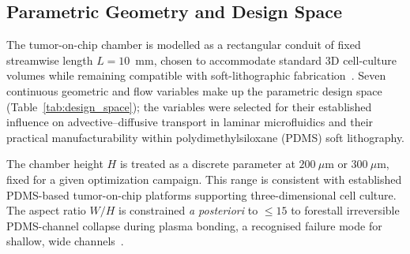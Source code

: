 \documentclass[12pt]{article}
\begin{document}
\subsection{Parametric Geometry and Design Space}
The tumor-on-chip chamber is modelled as a rectangular conduit of fixed streamwise length $L = 10$~mm, chosen to accommodate standard 3D cell-culture volumes while remaining compatible with soft-lithographic fabrication~\cite{ayuso2021microfluidic}. Seven continuous geometric and flow variables make up the parametric design space (Table~\ref{tab:design_space}); the variables were selected for their established influence on advective--diffusive transport in laminar microfluidics and their practical manufacturability within polydimethylsiloxane (PDMS) soft lithography.

The chamber height $H$ is treated as a discrete parameter at $200~\mu$m or $300~\mu$m, fixed for a given optimization campaign. This range is consistent with established PDMS-based tumor-on-chip platforms supporting three-dimensional cell culture. The aspect ratio $W/H$ is constrained \emph{a posteriori} to $\leq 15$ to forestall irreversible PDMS-channel collapse during plasma bonding, a recognised failure mode for shallow, wide channels~\cite{xia1998}.
\end{document}
